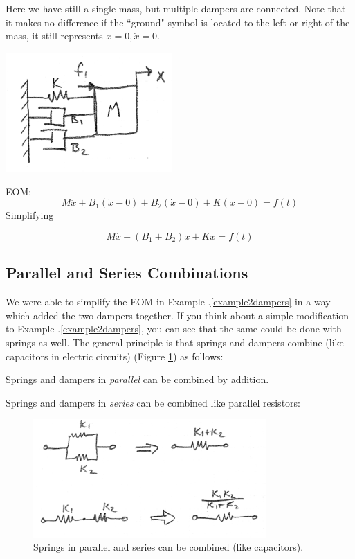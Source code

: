 \begin{ExampleSmall}\label{example2dampers}
Here we have still a single mass, but multiple dampers are connected.   Note that it makes no difference if the ``ground" symbol is located to the left or right of the mass, it still represents $x=0, \dot{x}=0$.



\includegraphics[width=2.5in]{figs02/00722a.png}


EOM:
\[
M\ddot{x} + B_1(\dot{x}-0)+B_2(\dot{x}-0)+K(x-0) = f(t)
\]
Simplifying

\[
M\ddot{x} + (B_1+B_2)\dot{x}+Kx = f(t)
\]
\end{ExampleSmall}


\subsection{Parallel and Series Combinations}
We were able to simplify the EOM in Example \thechapter.\ref{example2dampers} in a way which added the two dampers together.   If you think about a simple modification to Example \thechapter.\ref{example2dampers}, you can see that the same could be done with springs as well.
The general principle is that springs and dampers combine (like capacitors in electric circuits) (Figure \ref{seriessprings}) as follows:

Springs and dampers in {\it parallel} can be combined by addition.

Springs and dampers in {\it series}   can be combined like parallel resistors:

\begin{figure}[h]\centering
\includegraphics[width=3.5in]{figs02/00723a.png}
\caption{Springs in parallel and series can be combined (like capacitors).}\label{seriessprings}
\end{figure}


